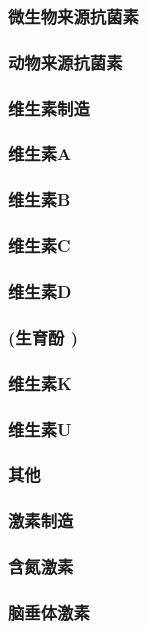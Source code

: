 \documentclass[UTF8]{../../ApplicationUniverse}
\begin{document}
        \subsubsection{微生物来源抗菌素}
        \subsubsection{动物来源抗菌素}
\subsubsection{维生素制造}
    \subsubsection{维生素A}
    \subsubsection{维生素B}
    \subsubsection{维生素C}
    \subsubsection{维生素D}
    \subsubsection{(生育酚 )}
    \subsubsection{维生素K}
    \subsubsection{维生素U}
    \subsubsection{其他}
\subsubsection{激素制造}
    \subsubsection{含氮激素}
    \subsubsection{脑垂体激素}
\end{document}
